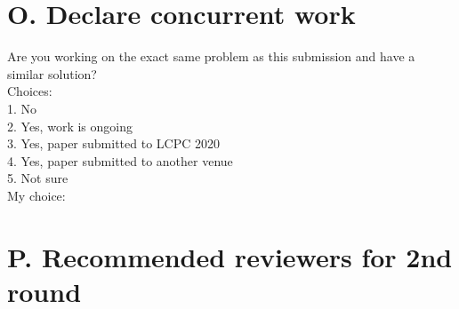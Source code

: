 \documentclass[]{ctexart}
\begin{document}
    \section{O. Declare concurrent work}
    \noindent Are you working on the exact same problem as this submission and 
    have a similar solution?\\
    Choices:\\
    \hspace*{2em}1. No\\
    \hspace*{2em}2. Yes, work is ongoing\\
    \hspace*{2em}3. Yes, paper submitted to LCPC 2020\\
    \hspace*{2em}4. Yes, paper submitted to another venue\\
    \hspace*{2em}5. Not sure\\
    My choice:
    \section{P. Recommended reviewers for 2nd round}
\end{document}
